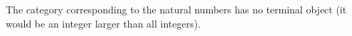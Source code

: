 The category corresponding to the natural numbers has no terminal object (it would be an integer larger than all integers).
